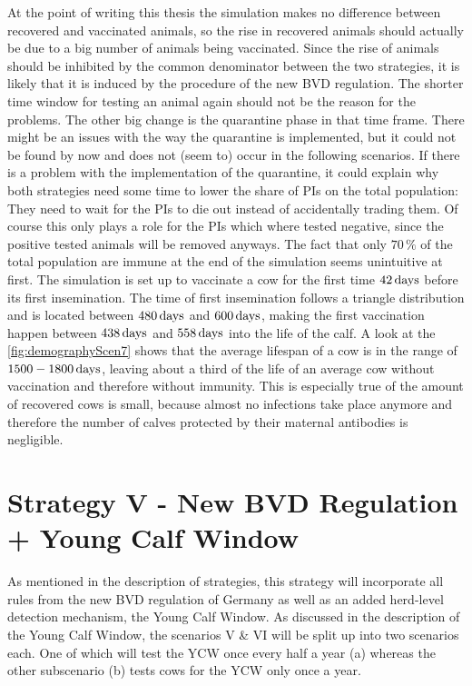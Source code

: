 At the point of writing this thesis the simulation makes no difference between recovered and vaccinated animals, so the rise in recovered animals should actually be due to a big number of animals being vaccinated. Since the rise of animals should be inhibited by the common denominator between the two strategies, it is likely that it is induced by the procedure of the new BVD regulation. The shorter time window for testing an animal again should not be the reason for the problems. The other big change is the quarantine phase in that time frame. There might be an issues with the way the quarantine is implemented, but it could not be found by now and does not (seem to) occur in the following scenarios. If there is a problem with the implementation of the quarantine, it could explain why both strategies need some time to lower the share of PIs on the total population: They need to wait for the PIs to die out instead of accidentally trading them. Of course this only plays a role for the PIs which where tested negative, since the positive tested animals will be removed anyways.
The fact that only $70\,\%$ of the total population are immune at the end of the simulation seems unintuitive at first. The simulation is set up to vaccinate a cow for the first time $42\,\text{days}$ before its first insemination. The time of first insemination follows a triangle distribution and is located between $480\,\text{days}$ and $600\,\text{days}$, making the first vaccination happen between $438\,\text{days}$ and $558\,\text{days}$ into the life of the calf. A look at the \ref{fig:demographyScen7} shows that the average lifespan of a cow is in the range of $1500-1800\,\text{days}$, leaving about a third of the life of an average cow without vaccination and therefore without immunity. This is especially true of the amount of recovered cows is small, because almost no infections take place anymore and therefore the number of calves protected by their maternal antibodies is negligible.


\section{Strategy V - New BVD Regulation + Young Calf Window}
As mentioned in the description of strategies, this strategy will incorporate all rules from the new BVD regulation of Germany as well as an added herd-level detection mechanism, the Young Calf Window. As discussed in the description of the Young Calf Window, the scenarios V \& VI will be split up into two scenarios each. One of which will test the YCW once every half a year (a) whereas the other subscenario (b) tests cows for the YCW only once a year.

